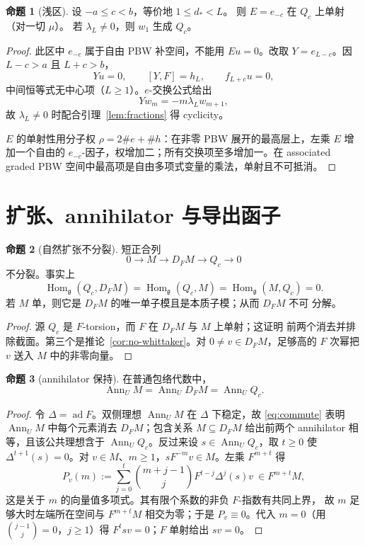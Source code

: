 \documentclass[UTF8,11pt]{ctexart}
\newcommand{\g}{\mathfrak g}
\newcommand{\ad}{\operatorname{ad}}
\newcommand{\Ann}{\operatorname{Ann}}
\newcommand{\Hom}{\operatorname{Hom}}
\theoremstyle{definition}
\newtheorem{proposition}{命题}[section]
\begin{document}
\begin{proposition}[浅区]\label{prop:shallow}
设 \(-a\le c<b\)，等价地 \(1\le d_*<L\)。
则 \(E=e_{-c}\) 在 \(Q_c\) 上单射（对一切 \(\mu\)）。
若 \(\lambda_L\ne0\)，则 \(w_1\) 生成 \(Q_c\)。
\end{proposition}

\begin{proof}
此区中 \(e_{-c}\) 属于自由 PBW 补空间，不能用 \(Eu=0\)。改取
\(Y=e_{L-c}\)。因 \(L-c>a\) 且 \(L+c>b\)，
\[
Yu=0,\qquad [Y,F]=h_L,\qquad f_{L+c}u=0,
\]
中间恒等式无中心项（\(L\ge1\)）。\(e\)-交换公式给出
\[
Yw_m=-m\lambda_Lw_{m+1},
\]
故 \(\lambda_L\ne0\) 时配合引理~\ref{lem:fractions} 得 cyclicity。

\(E\) 的单射性用分子权 \(\rho=2\#e+\#h\)：在非零 PBW 展开的最高层上，左乘
\(E\) 增加一个自由的 \(e_{-c}\)-因子，权增加二；所有交换项至多增加一。在
associated graded PBW 空间中最高项是自由多项式变量的乘法，单射且不可抵消。
\end{proof}

\section{扩张、annihilator 与导出函子}\label{sec:homological}

\begin{proposition}[自然扩张不分裂]\label{prop:extension}
短正合列
\[
0\longrightarrow M\longrightarrow D_FM\longrightarrow Q_c\longrightarrow0
\]
不分裂。事实上
\[
\Hom_\g(Q_c,D_FM)=\Hom_\g(Q_c,M)=\Hom_\g(M,Q_c)=0.
\]
若 \(M\) 单，则它是 \(D_FM\) 的唯一单子模且是本质子模；从而 \(D_FM\) 不可
分解。
\end{proposition}

\begin{proof}
源 \(Q_c\) 是 \(F\)-torsion，而 \(F\) 在 \(D_FM\) 与 \(M\) 上单射；这证明
前两个消去并排除截面。第三个是推论~\ref{cor:no-whittaker}。对
\(0\ne v\in D_FM\)，足够高的 \(F\) 次幂把 \(v\) 送入 \(M\) 中的非零向量。
\end{proof}

\begin{proposition}[annihilator 保持]\label{prop:ann}
在普通包络代数中，
\[
\Ann_U M=\Ann_U D_FM=\Ann_U Q_c.
\]
\end{proposition}

\begin{proof}
令 \(\Delta=\ad F\)。双侧理想 \(\Ann_UM\) 在 \(\Delta\) 下稳定，故
\eqref{eq:commute} 表明 \(\Ann_UM\) 中每个元素消去 \(D_FM\)；包含关系
\(M\subseteq D_FM\) 给出前两个 annihilator 相等，且该公共理想含于
\(\Ann_UQ_c\)。反过来设 \(s\in\Ann_UQ_c\)，取 \(t\ge0\) 使
\(\Delta^{t+1}(s)=0\)。对 \(v\in M\)、\(m\ge1\)，\(sF^{-m}v\in M\)。左乘
\(F^{m+t}\) 得
\[
P_v(m):=\sum_{j=0}^t\binom{m+j-1}{j}F^{t-j}\Delta^j(s)v
\ \in F^{m+t}M,
\]
这是关于 \(m\) 的向量值多项式。其有限个系数的非负 \(F\)-指数有共同上界，
故 \(m\) 足够大时左端所在空间与 \(F^{m+t}M\) 相交为零；于是
\(P_v\equiv0\)。代入 \(m=0\)（用 \(\binom{j-1}{j}=0\)，\(j\ge1\)）得
\(F^tsv=0\)；\(F\) 单射给出 \(sv=0\)。
\end{proof}
\end{document}
